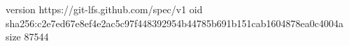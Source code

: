 version https://git-lfs.github.com/spec/v1
oid sha256:c2e7ed67e8ef4e2ac5c97f448392954b44785b691b151cab1604878ea0c4004a
size 87544
